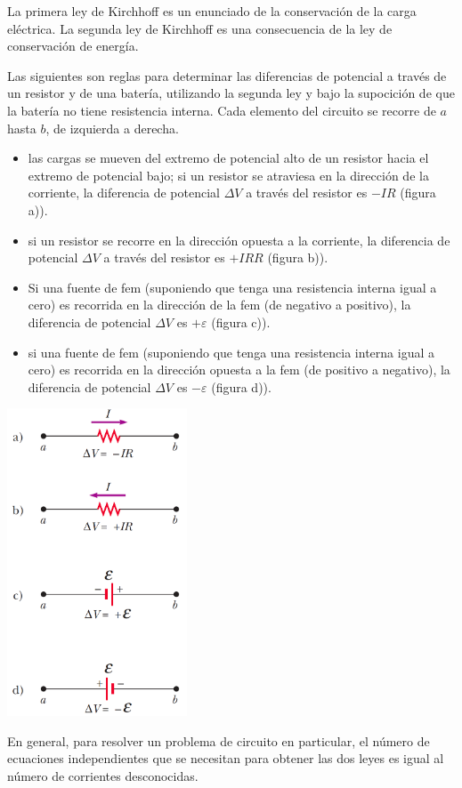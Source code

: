       \PN La primera ley de Kirchhoff es un enunciado de la conservación de la carga eléctrica. La segunda ley de
      Kirchhoff es una consecuencia de la ley de conservación de energía.

      \VS
      \PN Las siguientes son reglas para determinar las diferencias de potencial a través de un resistor y de una
      batería, utilizando la segunda ley y bajo la supocición de que la batería no tiene resistencia interna. Cada
      elemento del circuito se recorre de $a$ hasta $b$, de izquierda a derecha.
      \begin{multicols}{2}
        \begin{itemize}
          \item las cargas se mueven del extremo de potencial alto de un resistor hacia el extremo de potencial bajo; si
          un resistor se atraviesa en la dirección de la corriente, la diferencia de potencial $\Delta V$ a través del
          resistor es $-IR$ (figura a)).
          \item si un resistor se recorre en la dirección opuesta a la corriente, la diferencia de potencial $\Delta V$ a
          través del resistor es $+IRR$ (figura b)).
          \item Si una fuente de fem (suponiendo que tenga una resistencia interna igual a cero) es recorrida en la
          dirección de la fem (de negativo a positivo), la diferencia de potencial $\Delta V$ es $+\varepsilon$
          (figura c)).
        	\item si una fuente de fem (suponiendo que tenga una resistencia interna igual a cero) es recorrida en la
          dirección opuesta a la fem (de positivo a negativo), la diferencia de potencial $\Delta V$ es $-\varepsilon$
          (figura d)).
        \end{itemize}

        \includegraphics[width=0.4\textwidth]{4/figure_13}\par
      \end{multicols}

      \PN En general, para resolver un problema de circuito en particular, el número de ecuaciones independientes que se
      necesitan para obtener las dos leyes es igual al número de corrientes desconocidas.
